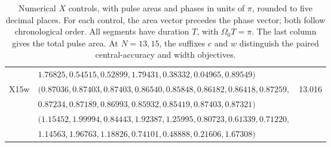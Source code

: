 \documentclass[10pt,aps,twocolumn,pra,floatfix,superscriptaddress]{revtex4-2}
\begin{document}
\begin{table}[tp]
\begin{ruledtabular}
\begin{tabular}{llr}
 & $1.76825,0.54515,0.52899,1.79431,0.38332,0.04965,0.89549)$ &  \\
X15w & $(0.87036,0.87403,0.87403,0.86540,0.85848,0.86182,0.86418,0.87259,$ & 13.016 \\
 & $0.87234,0.87189,0.86993,0.85932,0.85419,0.87403,0.87321)$ &  \\
 & $(1.15452,1.99994,0.84443,1.92387,1.25995,0.80723,0.61339,0.71220,$ &  \\
 & $1.14563,1.96763,1.18826,0.74101,0.48888,0.21606,1.67308)$ &  \\
\end{tabular}
\end{ruledtabular}
\caption{Numerical $X$ controls, with pulse areas and phases in units of $\pi$, rounded to five decimal places. For each control, the area vector precedes the phase vector; both follow chronological order. All segments have duration $T$, with $\Omega_0T=\pi$. The last column gives the total pulse area. At $N=13,15$, the suffixes $c$ and $w$ distinguish the paired central-accuracy and width objectives.}
\label{table: paramsX}
\end{table}
\end{document}
